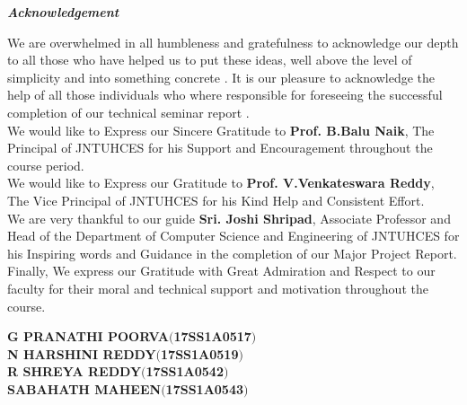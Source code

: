 \documentclass[12pt,a4paper]{report}
\begin{document}
\begin{center}
\textbf{\textit{\Large Acknowledgement }}
\end{center}
\large
We are overwhelmed in all humbleness and gratefulness to acknowledge our depth to all those who have helped us to put these ideas, well above the level of simplicity and into something concrete .
It is our pleasure to acknowledge the help of all those individuals who where responsible for foreseeing the successful completion of our technical seminar report .\\
We would like to Express our Sincere Gratitude to \textbf{Prof. B.Balu Naik}, The Principal of JNTUHCES for his Support and Encouragement throughout the course period.\\
We would like to Express our Gratitude to \textbf{Prof. V.Venkateswara Reddy}, The Vice Principal of JNTUHCES for his Kind Help and Consistent Effort.\\
We are very thankful to our guide \textbf{Sri. Joshi Shripad},  Associate Professor and Head of the Department of Computer Science and Engineering of JNTUHCES for his Inspiring words and Guidance in the completion of our Major Project Report.
Finally, We express our Gratitude with Great Admiration and Respect to our faculty for their moral and technical support and  motivation throughout the course.

\begin{flushright}
\textbf{\large G PRANATHI POORVA\hspace{0.2in}$ ( $17SS1A0517$)$}\\
\textbf{\large N HARSHINI REDDY\hspace{0.2in}$ ( $17SS1A0519$)$}\\
\textbf{\large R SHREYA REDDY\hspace{0.2in}$ ( $17SS1A0542$)$}\\
\textbf{\large SABAHATH MAHEEN\hspace{0.2in}$ ( $17SS1A0543$)$}
\end{flushright}
\end{document}
